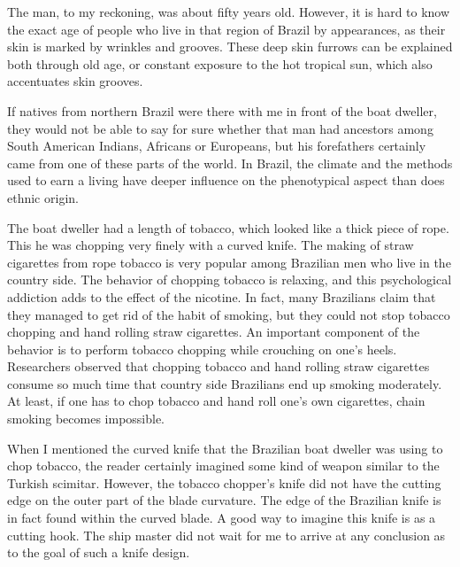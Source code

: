 \documentclass[
  12pt,
]{book}
\begin{document}
The man, to my reckoning, was about fifty years old. However, it is hard
to know the exact age of people who live in that region of Brazil by
appearances, as their skin is marked by wrinkles and grooves. These deep
skin furrows can be explained both through old age, or constant exposure
to the hot tropical sun, which also accentuates skin grooves.

If natives from northern Brazil were there with me in front of the boat
dweller, they would not be able to say for sure whether that man had
ancestors among South American Indians, Africans or Europeans, but his
forefathers certainly came from one of these parts of the world. In
Brazil, the climate and the methods used to earn a living have deeper
influence on the phenotypical aspect than does ethnic origin.

The boat dweller had a length of tobacco, which looked like a thick
piece of rope. This he was chopping very finely with a curved knife. The
making of straw cigarettes from rope tobacco is very popular among
Brazilian men who live in the country side. The behavior of chopping
tobacco is relaxing, and this psychological addiction adds to the effect
of the nicotine. In fact, many Brazilians claim that they managed to get
rid of the habit of smoking, but they could not stop tobacco chopping
and hand rolling straw cigarettes. An important component of the
behavior is to perform tobacco chopping while crouching on one's heels.
Researchers observed that chopping tobacco and hand rolling straw
cigarettes consume so much time that country side Brazilians end up
smoking moderately. At least, if one has to chop tobacco and hand roll
one's own cigarettes, chain smoking becomes impossible.

When I mentioned the curved knife that the Brazilian boat dweller was
using to chop tobacco, the reader certainly imagined some kind of weapon
similar to the Turkish scimitar. However, the tobacco chopper's knife
did not have the cutting edge on the outer part of the blade curvature.
The edge of the Brazilian knife is in fact found within the curved
blade. A good way to imagine this knife is as a cutting hook. The ship
master did not wait for me to arrive at any conclusion as to the goal of
such a knife design.
\end{document}
